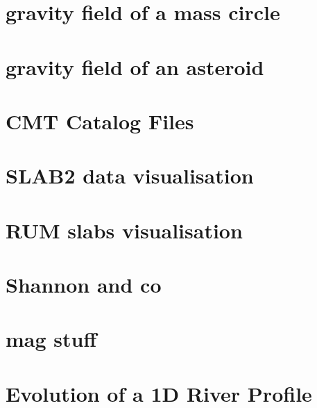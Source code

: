 \documentclass[a4paper,11pt]{report}
\begin{document}
\chapter{gravity field of a mass circle\label{f132}}

\chapter{gravity field of an asteroid\label{f133}}

\chapter{CMT Catalog Files\label{f134}}

\chapter{SLAB2 data visualisation\label{f135}}

\chapter{RUM slabs visualisation\label{f136}}

\chapter{Shannon and co \label{f137}}

\chapter{mag stuff \label{f138}}

\chapter{Evolution of a 1D River Profile\label{f139}}
\end{document}
